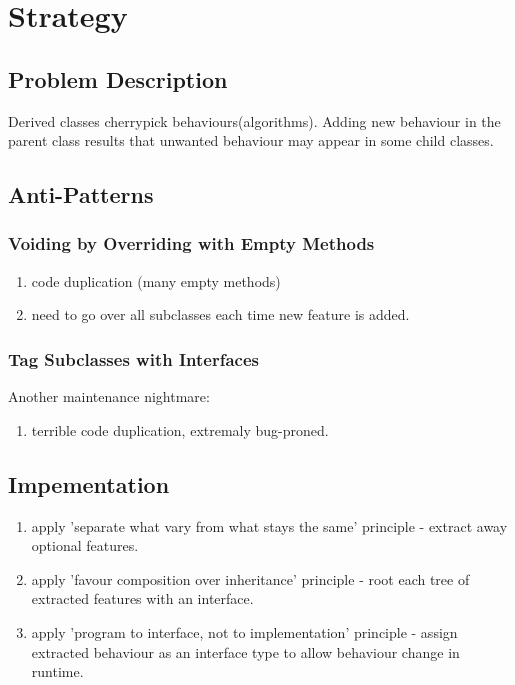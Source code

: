 \documentclass{report}
\begin{document}
\chapter{Strategy}


\section{Problem Description}
Derived classes cherrypick behaviours(algorithms). Adding new behaviour in the parent class results
that unwanted behaviour may appear in some child classes. 
 
 
\section{Anti-Patterns}

\subsection{Voiding by Overriding with Empty Methods}
\begin{enumerate}
  \item code duplication (many empty methods)
  \item need to go over all subclasses each time new feature is added.
\end{enumerate}

\subsection{Tag Subclasses with Interfaces}
Another maintenance nightmare:
\begin{enumerate}
  \item terrible code duplication, extremaly bug-proned.
\end{enumerate}


\section{Impementation}
\begin{enumerate}
  \item apply 'separate what vary from what stays the same' principle - extract away optional features.
  \item apply 'favour composition over inheritance' principle - root each tree of extracted features with an
  interface.
  \item apply 'program to interface, not to implementation' principle - assign extracted behaviour as an 
  interface type to allow behaviour change in runtime.
\end{enumerate}
\end{document}
